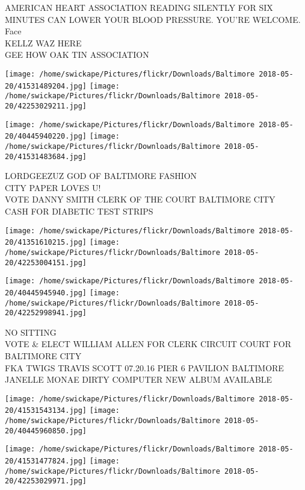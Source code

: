 \documentclass[10pt,letterpaper]{article}
\begin{document}
AMERICAN HEART ASSOCIATION READING SILENTLY FOR SIX MINUTES CAN LOWER YOUR BLOOD PRESSURE.  YOU'RE WELCOME.\\
Face\\
KELLZ WAZ HERE\\
GEE HOW OAK TIN ASSOCIATION\\
\pagebreak

\texttt{[image: /home/swickape/Pictures/flickr/Downloads/Baltimore 2018-05-20/41531489204.jpg]}
\texttt{[image: /home/swickape/Pictures/flickr/Downloads/Baltimore 2018-05-20/42253029211.jpg]}

\texttt{[image: /home/swickape/Pictures/flickr/Downloads/Baltimore 2018-05-20/40445940220.jpg]}
\texttt{[image: /home/swickape/Pictures/flickr/Downloads/Baltimore 2018-05-20/41531483684.jpg]}

LORDGEEZUZ GOD OF BALTIMORE FASHION\\
CITY PAPER LOVES U!\\
VOTE DANNY SMITH CLERK OF THE COURT BALTIMORE CITY\\
CASH FOR DIABETIC TEST STRIPS\\
\pagebreak

\texttt{[image: /home/swickape/Pictures/flickr/Downloads/Baltimore 2018-05-20/41351610215.jpg]}
\texttt{[image: /home/swickape/Pictures/flickr/Downloads/Baltimore 2018-05-20/42253004151.jpg]}

\texttt{[image: /home/swickape/Pictures/flickr/Downloads/Baltimore 2018-05-20/40445945940.jpg]}
\texttt{[image: /home/swickape/Pictures/flickr/Downloads/Baltimore 2018-05-20/42252998941.jpg]}

NO SITTING\\
VOTE \& ELECT WILLIAM ALLEN FOR CLERK CIRCUIT COURT FOR BALTIMORE CITY\\
FKA TWIGS TRAVIS SCOTT 07.20.16 PIER 6 PAVILION BALTIMORE\\
JANELLE MONAE DIRTY COMPUTER NEW ALBUM AVAILABLE\\
\pagebreak

\texttt{[image: /home/swickape/Pictures/flickr/Downloads/Baltimore 2018-05-20/41531543134.jpg]}
\texttt{[image: /home/swickape/Pictures/flickr/Downloads/Baltimore 2018-05-20/40445960850.jpg]}

\texttt{[image: /home/swickape/Pictures/flickr/Downloads/Baltimore 2018-05-20/41531477824.jpg]}
\texttt{[image: /home/swickape/Pictures/flickr/Downloads/Baltimore 2018-05-20/42253029971.jpg]}
\end{document}
